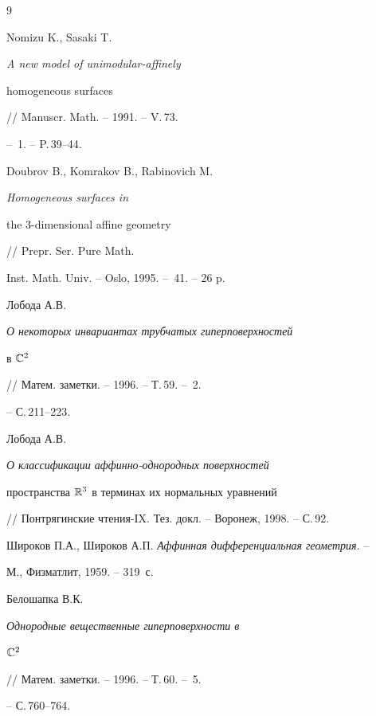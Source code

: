 \begin{thebibliography}{9}







Nomizu K., Sasaki T. {\em A new model of unimodular-affinely


homogeneous surfaces} // Manuscr. Math. -- 1991. -- V.\,73.


-- \No\,1. -- P.\,39--44.




Doubrov B., Komrakov B., Rabinovich M. {\em Homogeneous surfaces in


the $3$-dimensional affine geometry} // Prepr. Ser. Pure Math.


Inst. Math. Univ. -- Oslo, 1995. -- \No\,41. -- 26 p.




Лобода А.В. {\em О некоторых инвариантах трубчатых гиперповерхностей


в $\Bbb C^2$} // Матем. заметки. -- 1996. -- Т.\,59. -- \No\,2.


-- С.\,211--223.




Лобода А.В. {\em О классификации аффинно-однородных поверхностей


пространства $\Bbb R^3$ в терминах их нормальных уравнений}


// Понтрягинские чтения-IX. Тез. докл. -- Воронеж, 1998. -- С.\,92.




Широков П.А., Широков А.П. {\em Аффинная дифференциальная геометрия}. --


М., Физматлит, 1959. -- 319~с.




Белошапка В.К. {\em Однородные вещественные гиперповерхности в


$\Bbb C^2$} // Матем. заметки. -- 1996. -- Т.\,60. -- \No\,5.


-- С.\,760--764.





\end{thebibliography}





\vskip 2cm












\label{end}






